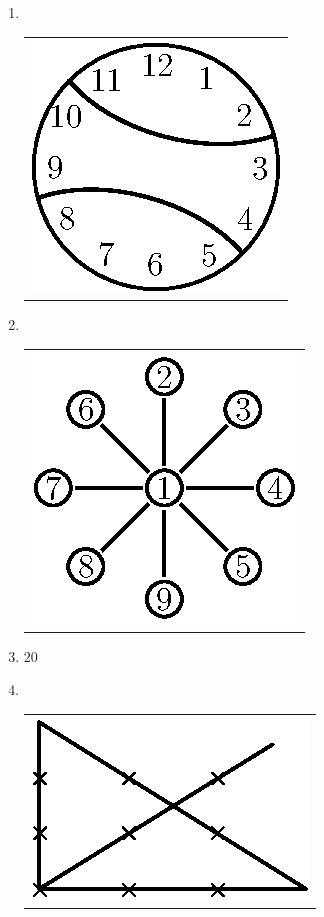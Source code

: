 \begin{enumerate}
\bigskip
\bigskip

\item 
~
  \vskip -0.6cm
  
\begin{tabular}[t]{c}
\centering
\includegraphics{src/figures/ans27.eps}
\end{tabular}

\vfill\eject

\item 
~

  \vskip -0.4cm
  
\begin{tabular}[t]{c}
\centering
\includegraphics{src/figures/ans28.eps}
\end{tabular}

\item $20$

\item 
~

  \vskip -0.4cm
  
\begin{tabular}[t]{c}
\centering
\includegraphics{src/figures/ans30.eps}
\end{tabular}


\end{enumerate}
